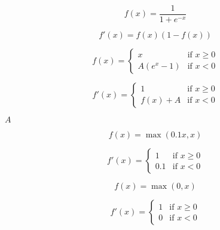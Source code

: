 \documentclass{article}
\begin{document}
\[
f(x) = \frac{1}{1 + e^{-x}}
\]
\pagebreak

\[
f'(x) = f(x)(1 - f(x))
\]
\pagebreak

\[
f(x) = \begin{cases}
x & \text{if } x \geq 0 \\
A(e^x - 1) & \text{if } x < 0
\end{cases}
\]
\pagebreak

\[
f'(x) = \begin{cases}
1 & \text{if } x \geq 0 \\
f(x) + A & \text{if } x < 0
\end{cases}
\]
\pagebreak

$A$
\pagebreak

\[
f(x) = \max(0.1x, x)
\]
\pagebreak

\[
f'(x) = \begin{cases}
1 & \text{if } x \geq 0 \\
0.1 & \text{if } x < 0
\end{cases}
\]
\pagebreak

\[
 f(x) = \max(0, x)
 \]
\pagebreak

\[
 f'(x) = \begin{cases}
 1 & \text{if } x \geq 0 \\
 0 & \text{if } x < 0
 \end{cases}
 \]
\pagebreak
\end{document}
